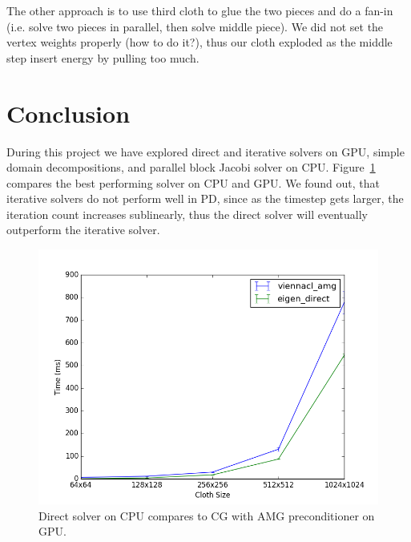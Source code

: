 \documentclass{article}
\begin{document}
The other approach is to use third cloth to glue the two pieces and do a
fan-in (i.e. solve two pieces in parallel, then solve middle piece). We did
not set the vertex weights properly (how to do it?), thus our cloth exploded
as the middle step insert energy by pulling too much.


\section{Conclusion}
During this project we have explored direct and iterative solvers on GPU,
simple domain decompositions, and parallel block Jacobi solver on CPU.
Figure~\ref{fig:amg_direct} compares the best performing solver on CPU and
GPU.
We found out, that iterative solvers do not perform well in PD, since as the
timestep gets larger, the iteration count increases sublinearly, thus the
direct solver will eventually outperform the iterative solver.

\begin{figure}[htb!]
        \centering
        \includegraphics[width=\linewidth]{img/amg_direct.png}
        \caption{Direct solver on CPU compares to CG with AMG preconditioner
                 on GPU.}
        \label{fig:amg_direct}
\end{figure}


{}

\end{document}
